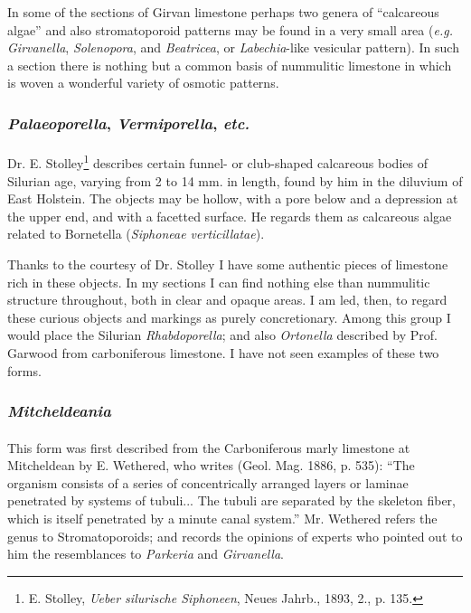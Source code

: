 \documentclass[a4paper, 12pt, oneside, landscape]{article}
\begin{document}
In some of the sections of Girvan limestone perhaps two genera of ``calcareous algae'' and also stromatoporoid patterns may be found in a very small area (\emph{e.g.} \emph{Girvanella}, \emph{Solenopora}, and \emph{Beatricea}, or \emph{Labechia}-like vesicular pattern). In such a section there is nothing but a common basis of nummulitic limestone in which is woven a wonderful variety of osmotic patterns.

\subsubsection{\emph{Palaeoporella}, \emph{Vermiporella}, \emph{etc.}}
\paragraph{}
Dr. E. Stolley\footnote{E. Stolley, \emph{Ueber silurische Siphoneen}, Neues Jahrb., 1893, 2., p. 135.} describes certain funnel- or club-shaped calcareous bodies of Silurian age, varying from 2 to 14 mm. in length, found by him in the diluvium of East Holstein. The objects may be hollow, with a pore below and a depression at the upper end, and with a facetted surface. He regards them as calcareous algae related to Bornetella (\emph{Siphoneae verticillatae}).

Thanks to the courtesy of Dr. Stolley I have some authentic pieces of limestone rich in these objects. In my sections I can find nothing else than nummulitic structure throughout, both in clear and opaque areas. I am led, then, to regard these curious objects and markings as purely concretionary. Among this group I would place the Silurian \emph{Rhabdoporella}; and also \emph{Ortonella} described by Prof. Garwood from carboniferous limestone. I have not seen examples of these two forms.

\subsubsection{\emph{Mitcheldeania}}
\paragraph{}
This form was first described from the Carboniferous marly limestone at Mitcheldean by E. Wethered, who writes (Geol. Mag. 1886, p. 535): ``The organism consists of a series of concentrically arranged layers or laminae penetrated by systems of tubuli... The tubuli are separated by the skeleton fiber, which is itself penetrated by a minute canal system.'' Mr. Wethered refers the genus to Stromatoporoids; and records the opinions of experts who pointed out to him the resemblances to \emph{Parkeria} and \emph{Girvanella}.
\end{document}
